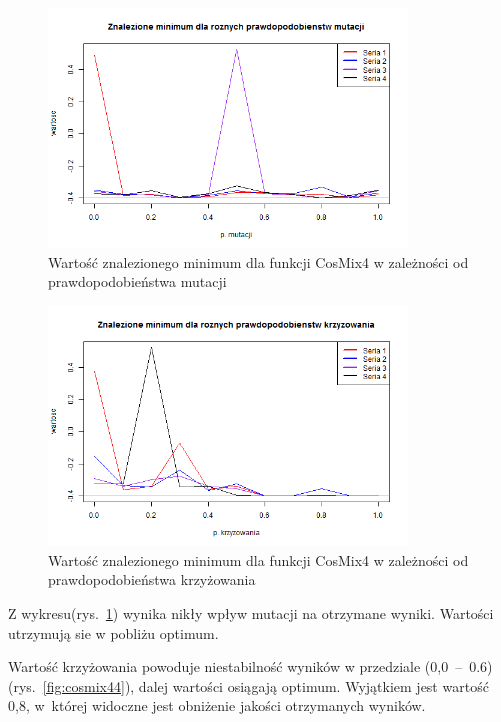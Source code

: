 \documentclass[11pt, a4paper]{article}
\newcommand{\fbi}{\leavevmode{\parindent=1em\indent}}
\begin{document}
\begin{figure}[H]
	\begin{center}
		\includegraphics[width=0.85\textwidth]{./assets/CosMix42.png}
		\caption{Wartość znalezionego minimum dla funkcji CosMix4 w zależności od prawdopodobieństwa mutacji}
		\label{fig:cosmix42}
	\end{center}
\end{figure}

\begin{figure}[H]
	\begin{center}
		\includegraphics[width=0.85\textwidth]{./assets/CosMix43.png}
		\caption{Wartość znalezionego minimum dla funkcji CosMix4 w zależności od prawdopodobieństwa krzyżowania}
		\label{fig:cosmix43}
	\end{center}
\end{figure}

\fbi
Z wykresu(rys.~\ref{fig:cosmix42}) wynika nikły wpływ mutacji na otrzymane wyniki. Wartości utrzymują sie w pobliżu optimum.

\fbi
Wartość krzyżowania powoduje niestabilność wyników w przedziale (0,0~--~0.6)(rys.~\ref{fig:cosmix44}), dalej wartości osiągają optimum. Wyjątkiem jest wartość 0,8, w~której widoczne jest obniżenie jakości otrzymanych wyników.
\end{document}
